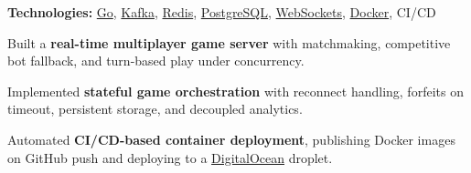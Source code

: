 \documentclass[]{deedy-resume-openfont}
\begin{document}
\begin{minipage}[t]{0.66\textwidth}
\vspace{2pt}
\textbf{Technologies:} \href{https://go.dev/}{Go}, \href{https://kafka.apache.org/}{Kafka}, \href{https://redis.io/}{Redis}, \href{https://www.postgresql.org/}{PostgreSQL}, \href{https://developer.mozilla.org/en-US/docs/Web/API/WebSockets_API}{WebSockets}, \href{https://www.docker.com/}{Docker}, {CI/CD}
\begin{tightemize}
\vspace{4pt}
\item Built a \textbf{real-time multiplayer game server} with matchmaking, competitive bot fallback, and turn-based play under concurrency.
\item Implemented \textbf{stateful game orchestration} with reconnect handling, forfeits on timeout, persistent storage, and decoupled analytics.
\item Automated \textbf{CI/CD-based container deployment}, publishing Docker images on GitHub push and deploying to a \href{https://www.digitalocean.com/products/droplets}{DigitalOcean} droplet.

\end{tightemize}

\end{minipage} 
\end{document}
